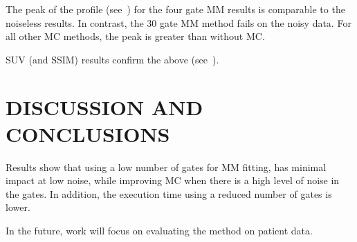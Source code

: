     The peak of the profile (see~) for the four gate \gls{MM} results is comparable to the noiseless results. In contrast, the $30$ gate \gls{MM} method fails on the noisy data. For all other \gls{MC} methods, the peak is greater than without \gls{MC}.
     
    \acrshort{SUV} (and \acrshort{SSIM}) results confirm the above (see~).


\section{DISCUSSION AND CONCLUSIONS} \label{sec:discussion_and_conclusions}
    Results show that using a low number of gates for \gls{MM} fitting, has minimal impact at low noise, while improving \gls{MC} when there is a high level of noise in the gates. In addition, the execution time using a reduced number of gates is lower.
    
    In the future, work will focus on evaluating the method on patient data.
    